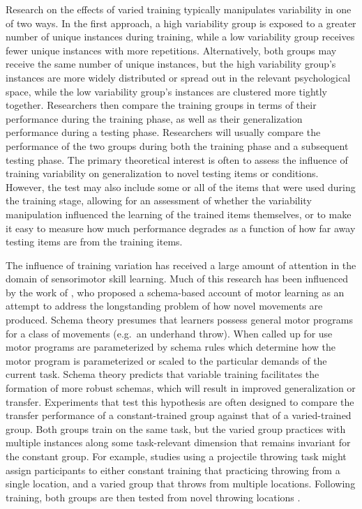 \documentclass[
  12pt,
  letterpaper,
]{article}
\begin{document}
Research on the effects of varied training typically manipulates
variability in one of two ways. In the first approach, a high
variability group is exposed to a greater number of unique instances
during training, while a low variability group receives fewer unique
instances with more repetitions. Alternatively, both groups may receive
the same number of unique instances, but the high variability group's
instances are more widely distributed or spread out in the relevant
psychological space, while the low variability group's instances are
clustered more tightly together. Researchers then compare the training
groups in terms of their performance during the training phase, as well
as their generalization performance during a testing phase. Researchers
will usually compare the performance of the two groups during both the
training phase and a subsequent testing phase. The primary theoretical
interest is often to assess the influence of training variability on
generalization to novel testing items or conditions. However, the test
may also include some or all of the items that were used during the
training stage, allowing for an assessment of whether the variability
manipulation influenced the learning of the trained items themselves, or
to make it easy to measure how much performance degrades as a function
of how far away testing items are from the training items.

The influence of training variation has received a large amount of
attention in the domain of sensorimotor skill learning. Much of this
research has been influenced by the work of
\textcite{schmidtSchemaTheoryDiscrete1975}, who proposed a schema-based
account of motor learning as an attempt to address the longstanding
problem of how novel movements are produced. Schema theory presumes that
learners possess general motor programs for a class of movements
(e.g.~an underhand throw). When called up for use motor programs are
parameterized by schema rules which determine how the motor program is
parameterized or scaled to the particular demands of the current task.
Schema theory predicts that variable training facilitates the formation
of more robust schemas, which will result in improved generalization or
transfer. Experiments that test this hypothesis are often designed to
compare the transfer performance of a constant-trained group against
that of a varied-trained group. Both groups train on the same task, but
the varied group practices with multiple instances along some
task-relevant dimension that remains invariant for the constant group.
For example, studies using a projectile throwing task might assign
participants to either constant training that practicing throwing from a
single location, and a varied group that throws from multiple locations.
Following training, both groups are then tested from novel throwing
locations
\autocite{pigottMotorSchemaStructure1984,willeyLimitedGeneralizationVaried2018,pachecoLearningSpecificIndividual2018,wulfEffectTypePractice1991}.
\end{document}
